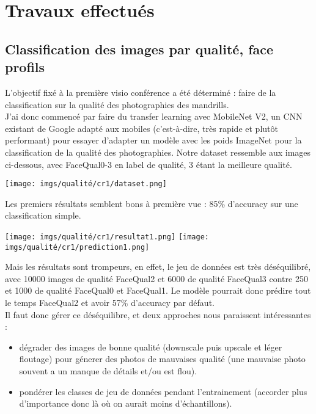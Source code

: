 \section{Travaux effectués} 

\subsection{Classification des images par qualité, face profils}
L'objectif fixé à la première visio conférence a été déterminé : faire de la classification sur la qualité des photographies des mandrills.\\

J'ai donc commencé par faire du transfer learning avec MobileNet V2, un CNN existant de Google adapté aux mobiles (c'est-à-dire, très rapide et plutôt performant) pour essayer d'adapter un modèle avec les poids ImageNet pour la classification de la qualité des photographies. Notre dataset ressemble aux images ci-dessous, avec FaceQual0-3 en label de qualité, 3 étant la meilleure qualité.

\begin{center}
\texttt{[image: imgs/qualité/cr1/dataset.png]}
\end{center}

Les premiers résultats semblent bons à première vue : 85\% d'accuracy sur une classification simple.

\begin{center}
\texttt{[image: imgs/qualité/cr1/resultat1.png]}
\texttt{[image: imgs/qualité/cr1/prediction1.png]}
\end{center}

Mais les résultats sont trompeurs, en effet, le jeu de données est très déséquilibré, avec 10000 images de qualité FaceQual2 et 6000 de qualité FaceQual3 contre 250 et 1000 de qualité FaceQual0 et FaceQual1. Le modèle pourrait donc prédire tout le temps FaceQual2 et avoir 57\% d'accuracy par défaut.\\

Il faut donc gérer ce déséquilibre, et deux approches nous paraissent intéressantes :\\
\begin{itemize}
    \item dégrader des images de bonne qualité (downscale puis upscale et léger floutage) pour génerer des photos de mauvaises qualité (une mauvaise photo souvent a un manque de détails et/ou est flou).
    \item pondérer les classes de jeu de données pendant l'entrainement (accorder plus d'importance donc là où on aurait moins d'échantillons).
\end{itemize}

